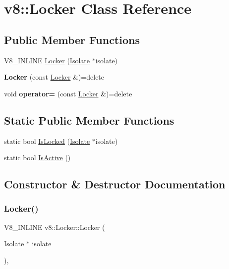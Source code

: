 \hypertarget{classv8_1_1Locker}{}\section{v8\+:\+:Locker Class Reference}
\label{classv8_1_1Locker}
\subsection*{Public Member Functions}
\begin{DoxyCompactItemize}
\item 
V8\+\_\+\+I\+N\+L\+I\+NE \mbox{\hyperlink{classv8_1_1Locker_a9f41151c92493a27d6724676fc774b51}{Locker}} (\mbox{\hyperlink{classv8_1_1Isolate}{Isolate}} $\ast$isolate)
\item 
\mbox{\label{classv8_1_1Locker_aa9afe5a3dc3d28bcfe3f418c3a5a8d1e}} 
{\bfseries Locker} (const \mbox{\hyperlink{classv8_1_1Locker}{Locker}} \&)=delete
\item 
\mbox{\label{classv8_1_1Locker_ad7ef23dade8390e16891ed5cec0e8692}} 
void {\bfseries operator=} (const \mbox{\hyperlink{classv8_1_1Locker}{Locker}} \&)=delete
\end{DoxyCompactItemize}
\subsection*{Static Public Member Functions}
\begin{DoxyCompactItemize}
\item 
static bool \mbox{\hyperlink{classv8_1_1Locker_a3ae563ffdd9e8b5a0100f0ae756b3a6a}{Is\+Locked}} (\mbox{\hyperlink{classv8_1_1Isolate}{Isolate}} $\ast$isolate)
\item 
static bool \mbox{\hyperlink{classv8_1_1Locker_a19d2b640f2f9b3dd0ec3a6c09a0442ed}{Is\+Active}} ()
\end{DoxyCompactItemize}


\subsection{Constructor \& Destructor Documentation}
\mbox{\label{classv8_1_1Locker_a9f41151c92493a27d6724676fc774b51}} 
\subsubsection{\texorpdfstring{Locker()}{Locker()}}
{\footnotesize\ttfamily V8\+\_\+\+I\+N\+L\+I\+NE v8\+::\+Locker\+::\+Locker (\begin{DoxyParamCaption}\item[{\mbox{\hyperlink{classv8_1_1Isolate}{Isolate}} $\ast$}]{isolate }\end{DoxyParamCaption})\hspace{0.3cm}{\ttfamily [inline]}, {\ttfamily [explicit]}}


